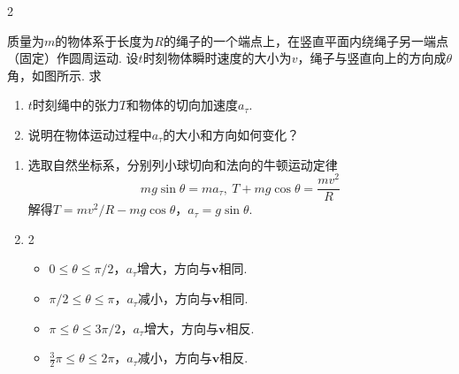 \begin{paracol}{2}
\begin{problem}
    质量为$m$的物体系于长度为$R$的绳子的一个端点上，在竖直平面内绕绳子另一端点（固定）作圆周运动. 设$t$时刻物体瞬时速度的大小为$v$，绳子与竖直向上的方向成$\theta$角，如图所示. 求
    \begin{enumerate}
        \item $t$时刻绳中的张力$T$和物体的切向加速度$a_\tau$.
        \item 说明在物体运动过程中$a_\tau$的大小和方向如何变化？
    \end{enumerate}
    \switchcolumn\vspace*{\fill}\centering
    \vspace*{\fill}
\end{problem}
\end{paracol}
\begin{solution}\leavevmode
\begin{enumerate}
    \item 选取自然坐标系，分别列小球切向和法向的牛顿运动定律
    \[mg\sin\theta=ma_{\tau},\ T+mg\cos\theta=\frac{mv^2}{R}\]
    解得$T=mv^2/R-mg\cos\theta$，$a_{\tau}=g\sin\theta$.
    \item 
    \begin{multicols}{2}
        \begin{itemize}
            \item $0\leq\theta\leq\pi/2$，$a_{\tau}$增大，方向与$\bm v$相同.
            \item $\pi/2\leq\theta\leq\pi$，$a_{\tau}$减小，方向与$\bm v$相同.
            \item $\pi\leq\theta\leq3\pi/2$，$a_{\tau}$增大，方向与$\bm v$相反.
            \item $\frac{3}{2}\pi\leq\theta\leq 2\pi$，$a_{\tau}$减小，方向与$\bm v$相反.
        \end{itemize}
    \end{multicols}
\end{enumerate}
\end{solution}

